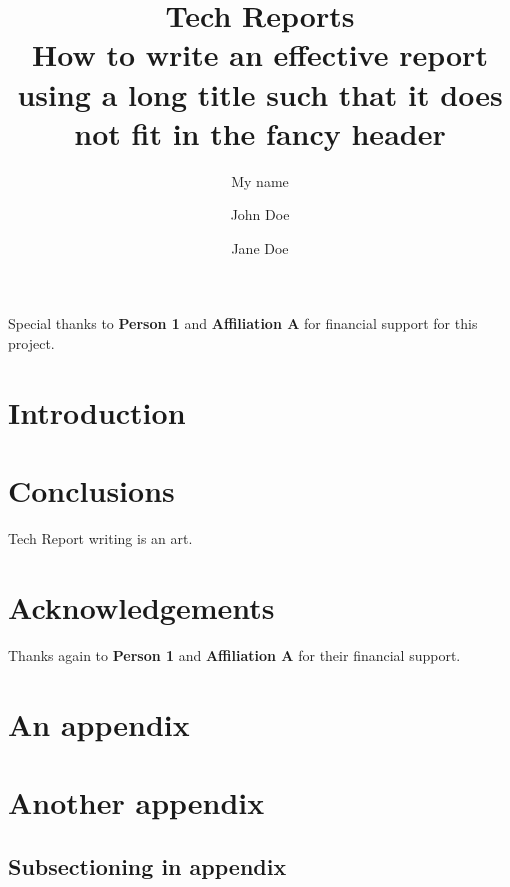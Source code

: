 \documentclass[12pt, letterpaper, twoside]{article}
\title{\textbf{Tech Reports\\How to write an effective report using a long title such that it does not fit in the fancy header}} %
\author{My name \and John Doe \and Jane Doe} %
\affiliation{My University} %
\begin{document}
\maketitle

\begin{abstract}
    \noindent
    \blindtext[1]

\end{abstract}

\vspace{2.5cm}

{\footnotesize
    \noindent
    Special thanks to \textbf{Person 1} and \textbf{Affiliation A} for financial support for this project.
}

\thispagestyle{firstpage}

\pagebreak


\setlength{\parindent}{1.5em} %
\newgeometry{} %

\section{Introduction}
\label{sec:intro}

\blindmathpaper

\section{Conclusions}
\label{sec:conc}

Tech Report writing is an art.

\section*{Acknowledgements}

Thanks again to \textbf{Person 1} and \textbf{Affiliation A} for their financial support.


% 
% 

\appendix

\section{An appendix}

\blindtext

\section{Another appendix}

\subsection*{Subsectioning in appendix}

\blindenumerate
\end{document}
